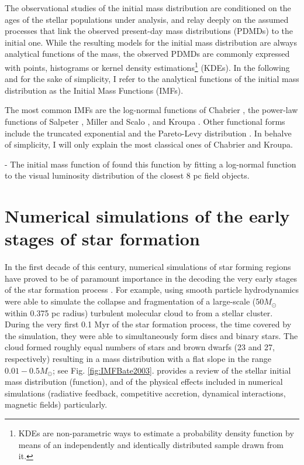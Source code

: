   The observational studies of the initial mass distribution are conditioned on the ages of the stellar populations under analysis, and relay deeply on the assumed processes that link the observed present-day mass distributions (PDMDs) to the initial one. While the resulting models for the initial mass distribution are always analytical functions of the mass, the observed PDMDs are commonly expressed with points, histograms or kernel density estimations\footnote{KDEs are non-parametric ways to estimate a probability density function by means of an independently and identically distributed sample drawn from it.} (KDEs). In the following and for the sake of simplicity, I refer to the analytical functions of the initial mass distribution as the Initial Mass Functions (IMFs). 

The most common IMFs are the log-normal functions of Chabrier \citep{Chabrier2003,Chabrier2005}, the power-law functions of Salpeter \citep{Salpeter1955}, Miller and Scalo \citep{Miller1979}, and Kroupa \citep{Kroupa2001,Kroupa2002,Kroupa2013,Thies2007,Thies2008}. Other functional forms include the truncated exponential \citep{deMarchi2001} and the Pareto-Levy distribution \citep{Cartwright2012}. In behalve of simplicity, I will only explain the most classical ones of Chabrier and Kroupa.


- The initial mass function of \citet{Chabrier2003,Chabrier2005,Thies2007}
\citet{Chabrier2005} found this function by fitting a log-normal function to the visual luminosity distribution of the closest $8$ pc field objects.

\section{Numerical simulations of the early stages of star formation}
\label{sect:numerical_simulations}

In the first decade of this century, numerical simulations of star forming regions have proved to be of paramount importance in the decoding the very early stages of the star formation process \citep{2003MNRAS.339..577B,2005A&A...435..611J,2009MNRAS.392..590B,2009MNRAS.392.1363B,2009MNRAS.397..232B}. For example, \citet{2003MNRAS.339..577B} using smooth particle hydrodynamics were able to simulate the collapse and fragmentation of a large-scale ($50 M_{\odot}$ within 0.375 pc radius) turbulent molecular cloud to from a stellar cluster. During the very first 0.1 Myr of the star formation process, the time covered by the simulation, they were able to simultaneously form discs and binary stars. The cloud formed roughly equal numbers of stars and brown dwarfs (23 and 27, respectively) resulting in a mass distribution with a flat slope in the range $0.01-0.5 M_{\odot}$; see Fig. \ref{fig:IMFBate2003}. \citet{Offner2014} provides a review of the stellar initial mass distribution (function), and of the physical effects included in numerical simulations (radiative feedback, competitive accretion, dynamical interactions, magnetic fields) particularly. 

